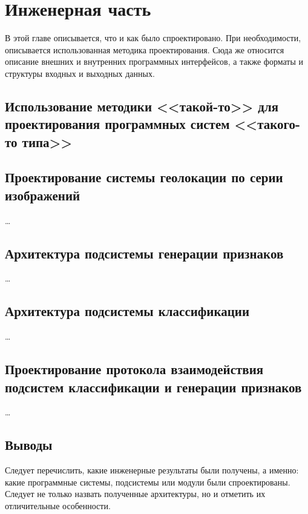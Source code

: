 \chapter{Инженерная часть}

В этой главе описывается, что и как было спроектировано. При необходимости, описывается использованная методика проектирования. Сюда же относится описание внешних и внутренних программных интерфейсов, а также форматы и структуры входных и выходных данных.

\section{Использование методики <<такой-то>> для проектирования программных систем <<такого-то типа>>}


\section{Проектирование системы геолокации по серии изображений}

\dots


\section{Архитектура подсистемы генерации признаков}

\dots


\section{Архитектура подсистемы классификации}

\dots


\section{
  Проектирование протокола взаимодействия подсистем 
  классификации и генерации признаков
}

\dots


\section{Выводы}

Следует перечислить, какие инженерные результаты были получены, а именно: 
какие программные системы, подсистемы или модули были спроектированы. Следует 
не только назвать полученные архитектуры, но и отметить их отличительные 
особенности.
